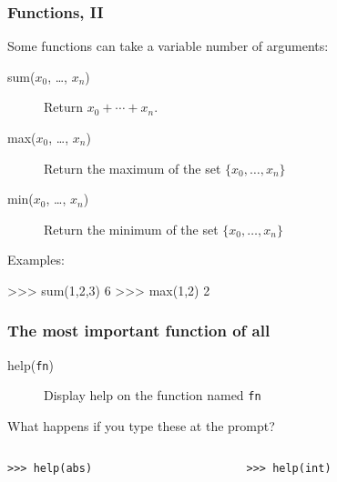 \documentclass[english,serif,mathserif,xcolor=pdftex,dvipsnames,table]{beamer}
\begin{document}
\begin{frame}[fragile]
  \frametitle{Functions, II}
  Some functions can take a variable number of arguments:
  \begin{description}
    \item[sum($x_0$, \ldots, $x_n$)] Return $x_0 + \cdots + x_n$.
    \item[max($x_0$, \ldots, $x_n$)] Return the maximum of the set $\{ x_0, \ldots, x_n \}$
    \item[min($x_0$, \ldots, $x_n$)] Return the minimum of the set $\{ x_0, \ldots, x_n \}$
  \end{description}

  \+ 
  Examples:
\begin{semiverbatim}
>>> sum(1,2,3)
6
>>> max(1,2)
2
\end{semiverbatim}
\end{frame}


\begin{frame}[fragile]
  \frametitle{The most important function of all}
  \begin{description}
  \item[help(\texttt{fn})] Display help on the function named \texttt{fn}
  \end{description}
  
  \+
  \begin{question}
    What happens if you type these at the prompt?
    \begin{columns}
      \begin{column}{0.45\textwidth}
        \texttt{>>> help(abs)}
      \end{column}
      \begin{column}{0.45\textwidth}
        \texttt{>>> help(int)}
      \end{column}
    \end{columns}
  \end{question}
\end{frame}
\end{document}
